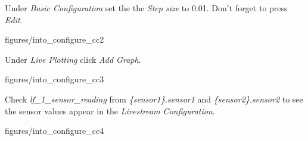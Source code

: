 \documentclass[11pt,a4paper]{../tutorial}
\begin{document}
\begin{instructions}

\newpage
\item Under \emph{Basic Configuration} set the the \emph{Step size} to 0.01. Don't forget to press \emph{Edit}.

    \begin{annotation}[width=0.85\linewidth,trim=0 70 0 0,clip]{figures/into_configure_cc2}
    \end{annotation}


\item Under \emph{Live Plotting} click \emph{Add Graph}.

    \begin{annotation}[width=0.85\linewidth,trim=0 0 0 30,clip]{figures/into_configure_cc3}
    \end{annotation}


\item Check \emph{lf\_1\_sensor\_reading} from \emph{\{sensor1\}.sensor1} and \emph{\{sensor2\}.sensor2} to see the sensor values appear in the \emph{Live\-stream Configuration}.


    \begin{annotation}[width=0.85\linewidth,trim=0 200 0 0,clip]{figures/into_configure_cc4}
    \end{annotation}

\end{instructions}
\end{document}
